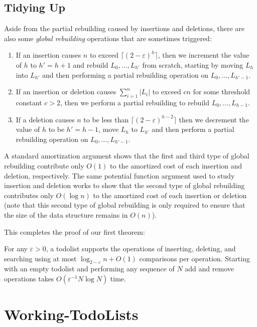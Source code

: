 \documentclass{patmorin}
\newcommand{\eps}{\varepsilon}
\begin{document}
\subsection{Tidying Up}

Aside from the partial rebuilding caused by insertions and deletions,
there are also some \emph{global rebuilding} operations that are sometimes
triggered:
\begin{enumerate}
\item If an insertion causes $n$ to exceed $\lceil(2-\eps)^h\rceil$, then
we increment the value of $h$ to $h'=h+1$ and rebuild $L_0,\ldots,L_{h'}$
from scratch, starting by moving $L_h$ into $L_{h'}$ and then performing
a partial rebuilding operation on $L_{0},\ldots,L_{h'-1}$.
\item If an insertion or deletion causes $\sum_{i=1}^n |L_i|$ to exceed $cn$ for some threshold constant $c>2$, then we perform a partial rebuilding to rebuild $L_{0},\ldots,L_{h-1}$.
\item If a deletion causes $n$ to be less than $\lceil(2-\eps)^{h-2}\rceil$ then we decrement the value of $h$ to be $h'=h-1$, move $L_h$ to $L_{h'}$ and then perform a partial rebuilding operation on $L_{0},\ldots,L_{h'-1}$. 
\end{enumerate}

A standard amortization argument shows that the first and third type
of global rebuilding contribute only $O(1)$ to the amortized cost of
each insertion and deletion, respectively.  The same potential function
argument used to study insertion and deletion works to show that the
second type of global rebuilding contributes only $O(\log n)$ to the
amortized cost of each insertion or deletion (note that this second
type of global rebuilding is only required to ensure that the size of
the data structure remains in $O(n)$).

This completes the proof of our first theorem:
\begin{thm}
For any $\eps >0$, a todolist supports the operations of inserting,
deleting, and searching using at most $\log_{2-\eps} n + O(1)$ comparisons
per operation.  Starting with an empty todolist and performing any
sequence of $N$ add and remove operations takes $O(\eps^{-1}N\log
N)$ time.
\end{thm}


\section{Working-TodoLists}
\end{document}
